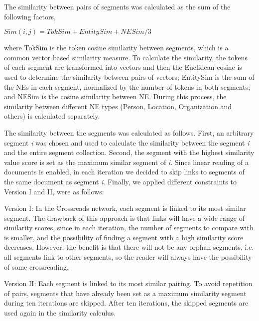 \documentclass{acm_proc_article-sp}
\begin{document}
The similarity between pairs of segments was calculated as the sum of the following factors, 

\medskip{}


\begin{center}
$Sim(i,j)=TokSim+EntitySim+NESim/3$
\par\end{center}

\medskip{}


where TokSim is the token cosine similarity between segments, which is a common vector based similarity measure. To calculate the similarity, the tokens of each segment are transformed into vectors and then the Euclidean cosine is used to determine the similarity between pairs of vectors; EntitySim is the sum of the NEs in each segment, normalized  by the number of tokens in both segments; and NESim is the cosine similarity between NE. During this process, the similarity between different NE types (Person, Location, Organization and others) is calculated separately. 

The similarity between the segments was calculated as follows.
First, an arbitrary segment \textit{i} was chosen and used to calculate the similarity between the segment \textit{i} and the entire segment collection.
Second, the segment with the highest similarity value score is set as the maximum similar segment of \textit{i}. Since linear reading of a documents is enabled, in each iteration we decided to skip links to segments of the same document as segment \textit{i}.
Finally, we applied different constraints to Version I and II, were as follows:

\begin{description}
\item Version I: In the Crossreads network, each segment is linked to its most similar segment. The drawback of this approach is that links will have a wide range of similarity scores, since in each iteration, the number of segments to compare with is smaller, and the possibility of finding a segment with a high similarity score decreases.
However, the benefit is that there will not be any orphan segments, i.e. all segments link to other segments, so the reader will always have the possibility of some crossreading.

\item Version II: Each segment is linked to its most similar pairing.   To avoid repetition of pairs, segments that have already been set as a maximum similarity segment during ten iterations are skipped. After ten iterations, the skipped segments are used again in the similarity calculus.
\end{description}
\end{document}
